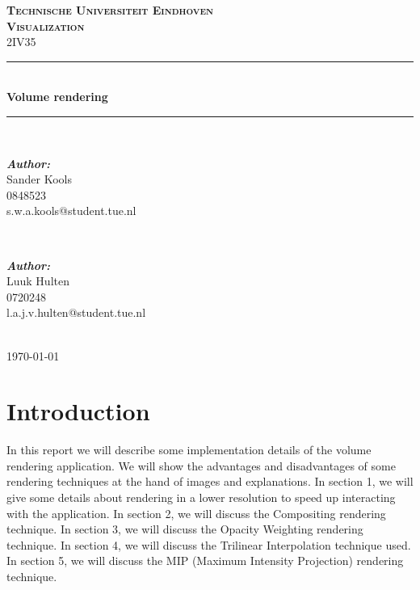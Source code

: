 \documentclass[a4paper,twoside,11pt]{article}
\newcommand{\HRule}{\rule{\linewidth}{0.5mm}} %
\begin{document}
\begin{titlepage}

\center %

\textsc{\Huge \textbf{Technische Universiteit Eindhoven}}\\[1.5cm] %
\textsc{\LARGE \textbf{Visualization}}\\[0.5cm] %
\textsc{\large 2IV35}\\[0.5cm] %

\HRule \\[0.4cm]
{ \huge \bfseries Volume rendering}\\[0.4cm] %
\HRule \\[1.5cm]

\begin{minipage}{0.4\textwidth}
\begin{flushleft} \large
\emph{\textbf{Author:}}\\
Sander Kools \\
0848523 \\
s.w.a.kools@student.tue.nl %
\end{flushleft}
\end{minipage}
~
\begin{minipage}{0.4\textwidth}
\begin{flushright} \large
\emph{\textbf{Author:}}\\
Luuk Hulten\\
0720248 \\
l.a.j.v.hulten@student.tue.nl
\end{flushright}
\end{minipage}\\[4cm]

{\large \today}\\[3cm] %

\vfill %

\end{titlepage}

\newpage
\tableofcontents
\newpage

\section*{Introduction}
In this report we will describe some implementation details of the volume rendering application. We will show the advantages and disadvantages of some rendering techniques at the hand of images and explanations.
In section 1, we will give some details about rendering in a lower resolution to speed up interacting with the application. \newline
In section 2, we will discuss the Compositing rendering technique.
In section 3, we will discuss the Opacity Weighting rendering technique.
In section 4, we will discuss the Trilinear Interpolation technique used.
In section 5, we will discuss the MIP (Maximum Intensity Projection) rendering technique. \newline
\end{document}
